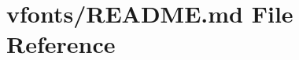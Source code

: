 \hypertarget{vfonts_2README_8md}{}\section{vfonts/\+R\+E\+A\+D\+ME.md File Reference}
\label{vfonts_2README_8md}
